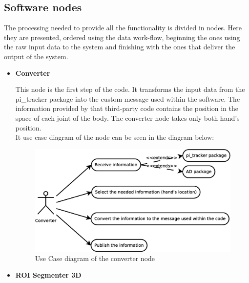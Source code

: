 \subsection{Software nodes}

The processing needed to provide all the functionality is divided in nodes. Here they are presented, ordered using the data work-flow, beginning the ones using the raw input data to the system and finishing with the ones that deliver the output of the system. 
\\

\begin{itemize}
	\item{\textbf{\large Converter}}\\
		\label{converter}

This node is the first step of the code. It transforms the input data from the pi\_tracker package into the custom message used within the software. The information provided by that third-party code contains the position in the space of each joint of the body. The converter node takes only both hand's position. 
\\

It use case diagram of the node can be seen in the diagram below: 

\begin{figure}[h]
	\begin{center}
\includegraphics[scale=0.2]{img/diagrams/uc_converter.eps}
	\caption[Use case diagram converter node]{Use Case diagram of the converter node}
	\end{center}
\end{figure}

	
	\item{\textbf{ROI Segmenter 3D}}\\
	\label{roi_segmenter_3d}


\end{itemize}
